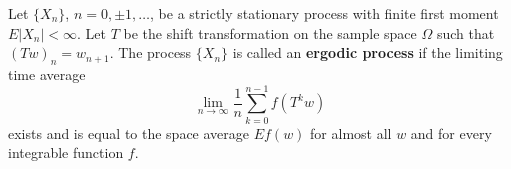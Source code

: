 Let $\{X_n\}$, $n = 0, \pm 1, \ldots$, be a strictly stationary process with finite first moment $E|X_n| < \infty$. Let $T$ be the shift transformation on the sample space $\Omega$ such that $(Tw)_n = w_{n+1}$. The process $\{X_n\}$ is called an \textbf{ergodic process} if the limiting time average
$$\lim_{n \to \infty} \frac{1}{n} \sum_{k=0}^{n-1} f(T^k w)$$
exists and is equal to the space average $Ef(w)$ for almost all $w$ and for every integrable function $f$.
